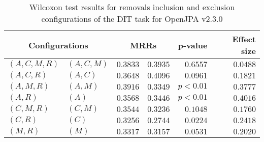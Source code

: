 
\begin{table}
\begin{spacing}{1.2}
\centering
\caption{Wilcoxon test results for removals inclusion and exclusion configurations of the DIT task for OpenJPA v2.3.0}
\label{table:versus-wilcox-openjpa-dit-removals}
\begin{tabular}{ll|rr|rr}
\toprule
      \multicolumn{2}{c|}{Configurations} &          \multicolumn{2}{c|}{MRRs} &       p-value & Effect size \\
\midrule
 $(A,C,M,R)$ &  $(A,C,M)$ & $0.3833$ & $0.3935$ & $0.6557$ &    $0.0488$ \\
   $(A,C,R)$ &    $(A,C)$ & $0.3648$ & $0.4096$ & $0.0961$ &    $0.1821$ \\
   $(A,M,R)$ &    $(A,M)$ & $0.3916$ & $0.3349$ & $p<0.01$ &    $0.3777$ \\
     $(A,R)$ &      $(A)$ & $0.3568$ & $0.3446$ & $p<0.01$ &    $0.4016$ \\
   $(C,M,R)$ &    $(C,M)$ & $0.3544$ & $0.3236$ & $0.1048$ &    $0.1760$ \\
     $(C,R)$ &      $(C)$ & $0.3256$ & $0.2744$ & $0.0224$ &    $0.2418$ \\
     $(M,R)$ &      $(M)$ & $0.3317$ & $0.3157$ & $0.0531$ &    $0.2020$ \\
\bottomrule
\end{tabular}

\end{spacing}
\end{table}

